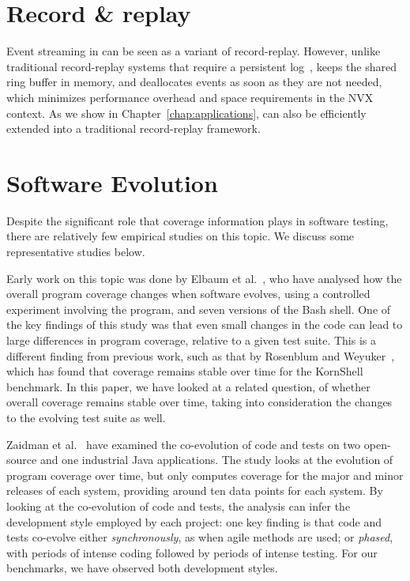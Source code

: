 \section{Record \& replay}

Event streaming in \nx can be seen as a variant of record-replay. However,
unlike traditional record-replay systems that require a persistent
log~\cite{scribe,jockey,geels06,r2}, \nx keeps the shared ring buffer in
memory, and deallocates events as soon as they are not needed, which minimizes
performance overhead and space requirements in the NVX context. As we show in
Chapter~\ref{chap:applications}, \nx can also be efficiently extended into a
traditional record-replay framework.

\section{Software Evolution}

Despite the significant role that coverage information plays in
software testing, there are relatively few empirical studies on this
topic.  We discuss some representative studies below.

Early work on this topic was done by Elbaum et
al.~\cite{cov-evol:icsm01}, who have analysed how the overall program
coverage changes when software evolves, using a controlled experiment
involving the  program, and seven versions of
the Bash shell.  One of the key findings of this study was that
even small changes in the code can lead to large differences in
program coverage, relative to a given test suite.  This is a different
finding from previous work, such as that by Rosenblum and
Weyuker~\cite{cov_regr97}, which has found that coverage remains
stable over time for the KornShell benchmark.  In this paper, we have
looked at a related question, of whether overall coverage remains
stable over time, taking into consideration the changes to the
evolving test suite as well.

Zaidman et al.~\cite{coevol:emse11} have examined the co-evolution of
code and tests on two open-source and one industrial Java
applications.  The study looks at the evolution of program coverage
over time, but only computes coverage for the major and minor releases
of each system, providing around ten data points for each system.  By
looking at the co-evolution of code and tests, the analysis can infer
the development style employed by each project: one key finding is
that code and tests co-evolve either \textit{synchronously}, as when
agile methods are used; or \textit{phased}, with periods of intense
coding followed by periods of intense testing.  For our
benchmarks, we have observed both development styles.

